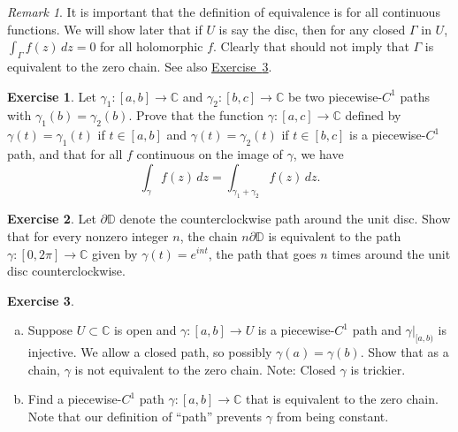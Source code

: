 \documentclass[12pt,openany]{book}
\newcommand{\C}{{\mathbb{C}}}
\newcommand{\D}{{\mathbb{D}}}
\newcommand{\myquote}[1]{``#1''}
\theoremstyle{plain}
\theoremstyle{remark}
\newtheorem{remark}[thm]{Remark}
\theoremstyle{definition}
\newenvironment{exbox}{%
    \def\FrameCommand{\vrule width 1pt \relax\hspace{10pt}}%
    \MakeFramed{\advance\hsize-\width\FrameRestore}%
}{%
    \endMakeFramed
}
\newenvironment{exparts}{%
    \leavevmode\begin{enumerate}[a),noitemsep,topsep=0pt,parsep=0pt,partopsep=0pt]
}{%
    \end{enumerate}
}
\theoremstyle{exercise}
\newtheorem{exercise}{Exercise}[section]
\theoremstyle{example}
\newcommand{\exerciseref}[1]{\hyperref[#1]{Exercise~\ref*{#1}}}
\begin{document}
\begin{remark}
It is important that the definition of equivalence is for all continuous
functions.  We will show later that if $U$ is say the disc, then for
any closed $\Gamma$ in $U$, $\int_\Gamma f(z) \, dz = 0$ for all holomorphic $f$.
Clearly that should not imply that $\Gamma$ is equivalent to the zero
chain.
See also \exerciseref{exercise:nonconstantnonzerochain}.
\end{remark}

\begin{exbox}
\begin{exercise}%
\label{exercise:pathsum}
Let $\gamma_1 \colon [a,b] \to \C$ and $\gamma_2 \colon [b,c] \to \C$
be two piecewise-$C^1$ paths with $\gamma_1(b)=\gamma_2(b)$.
Prove that the function $\gamma \colon [a,c] \to
\C$ defined by $\gamma(t) = \gamma_1(t)$ if $t \in [a,b]$ and $\gamma(t)
= \gamma_2(t)$ if $t \in [b,c]$ is a piecewise-$C^1$ path, and that
for all $f$ continuous on the image of $\gamma$, we have
\begin{equation*}
\int_{\gamma} f(z)\,dz = \int_{\gamma_1 + \gamma_2} f(z) \, dz .
\end{equation*}
\end{exercise}

\begin{exercise}
Let $\partial \D$ denote the counterclockwise path around the unit disc.
Show that for every nonzero integer $n$, the chain $n \partial \D$ is equivalent to
the path $\gamma \colon [0,2\pi] \to \C$ given by $\gamma(t) = e^{int}$,
the path that goes $n$ times around the unit disc counterclockwise.
\end{exercise}

\begin{exercise} \label{exercise:nonconstantnonzerochain}
\begin{exparts}
\item
Suppose $U \subset \C$ is open and
$\gamma \colon [a,b] \to U$
is a piecewise-$C^1$
path and $\gamma|_{[a,b)}$ is injective.
We allow a closed path,
so possibly $\gamma(a)=\gamma(b)$.  Show that as a chain, $\gamma$ is not equivalent to the zero chain.
Note: Closed $\gamma$ is trickier.
\item
Find a piecewise-$C^1$ path $\gamma \colon [a,b] \to \C$
that is equivalent to the zero chain.  Note that our definition of
\myquote{path}
prevents $\gamma$ from being constant.
\end{exparts}
\end{exercise}
\end{exbox}
\end{document}
